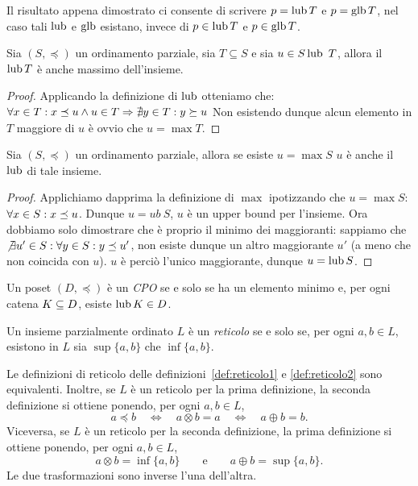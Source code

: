 Il risultato appena dimostrato ci consente di scrivere $p = \mathop{\mathrm{lub}}\nolimits T$ e
$p = \mathop{\mathrm{glb}}\nolimits T$, nel caso tali $\mathop{\mathrm{lub}}\nolimits$ e $\mathop{\mathrm{glb}}\nolimits$ esistano,
invece di $p \in \mathop{\mathrm{lub}}\nolimits T$ e $p \in \mathop{\mathrm{glb}}\nolimits T$.

\begin{proposizione} 
Sia $(S, \preceq)$ un ordinamento parziale, sia $T \subseteq S$ e sia $u \in S \mathop{\mathrm{lub}}\nolimits\ T$, allora il $\mathop{\mathrm{lub}}\nolimits T$ è anche massimo dell'insieme.
\end{proposizione}
\begin{proof}
Applicando la definizione di $\mathop{\mathrm{lub}}\nolimits$ otteniamo che:
$\forall x \in T \mathrel{:} x \preceq u \land u \in T \Rightarrow \nexists y \in T \mathrel{:} y \succeq u$
Non esistendo dunque alcun elemento in $T$ maggiore di $u$ è ovvio che $u = \max T$.
\end{proof}

\begin{proposizione} 
Sia $(S, \preceq)$ un ordinamento parziale, allora se esiste $u = \max S$ $u$ è anche il $\mathop{\mathrm{lub}}\nolimits$ di tale insieme.
\end{proposizione}
\begin{proof}
Applichiamo dapprima la definizione di $\max$ ipotizzando che $u = \max S$:
$\forall x \in S \mathrel{:} x \preceq u$. Dunque $u = ub\ S$, $u$ è un upper bound per l'insieme. Ora dobbiamo solo dimostrare che è proprio il minimo dei maggioranti: sappiamo che $\not \exists u' \in S \mathrel{:} \forall y \in S \mathrel{:} y \preceq u'$, non esiste dunque un altro maggiorante $u'$ (a meno che non coincida con $u$). $u$ è perciò l'unico maggiorante, dunque $u = \mathop{\mathrm{lub}}\nolimits S$.
\end{proof}


\begin{definizione} 
\label{def:cpo}
Un poset $(D, \preceq)$ \`e un \emph{CPO} se e solo se
ha un elemento minimo e, per ogni catena $K \subseteq D$, esiste $\mathop{\mathrm{lub}}\nolimits K \in D$.
\end{definizione}

\begin{definizione}  
\label{def:reticolo2}
Un insieme parzialmente ordinato $L$ \`e un \emph{reticolo} se e solo se,
per ogni $a, b \in L$, esistono in $L$ sia $\sup\{a,b\}$ che $\inf\{a,b\}$.
\end{definizione}

\begin{proposizione}
\textup{\cite{BurrisS81}} Le definizioni di reticolo
delle definizioni~\textup{\ref{def:reticolo1}} e \textup{\ref{def:reticolo2}}
sono equivalenti.
Inoltre, se $L$ \`e
un reticolo per la prima definizione, la seconda definizione si ottiene
ponendo, per ogni $a,b \in L$,
\[
    a \preceq b \quad\iff\quad a \otimes b = a \quad\iff\quad a \oplus b = b.
\]
Viceversa, se $L$ \`e un reticolo per la seconda definizione,
la prima definizione si ottiene ponendo, per ogni $a,b \in L$,
\[
    a \otimes b = \inf\{a,b\} \qquad\mbox{e}\qquad a \oplus b = \sup\{a,b\}.
\]
Le due trasformazioni sono inverse l'una dell'altra.
\end{proposizione}

